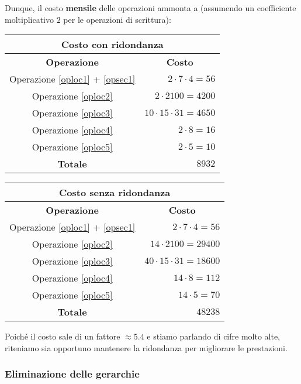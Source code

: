 \documentclass[a4paper,11pt]{article}
\begin{document}
\newline
Dunque, il costo \textbf{mensile} delle operazioni ammonta a (assumendo un
coefficiente moltiplicativo $2$ per le operazioni di scrittura):
\begin{center}
\begin{tabular}{ |c | r| }
  \hline
  \multicolumn{2}{|c|}{\textbf{Costo con ridondanza}} \\
  \hline
  \textbf{Operazione} & \multicolumn{1}{c|}{\textbf{Costo}} \\
  \hline
  Operazione \ref{oploc1} + \ref{opsec1} & $2 \cdot 7 \cdot 4 = 56$ \\
  \hline
  Operazione \ref{oploc2} & $2 \cdot 2100 = 4200$ \\
  \hline
  Operazione \ref{oploc3} & $10 \cdot 15 \cdot 31 = 4650$ \\
  \hline
  Operazione \ref{oploc4} & $2 \cdot 8 = 16$ \\
  \hline
  Operazione \ref{oploc5} & $2 \cdot 5 = 10$ \\
  \hline
  \textbf{Totale} & $8932$ \\
  \hline
\end{tabular}
\end{center}
\begin{center}
\begin{tabular}{ |c | r| }
  \hline
  \multicolumn{2}{|c|}{\textbf{Costo senza ridondanza}} \\
  \hline
  \textbf{Operazione} & \multicolumn{1}{c|}{\textbf{Costo}} \\
  \hline
  Operazione \ref{oploc1} + \ref{opsec1} & $2 \cdot 7 \cdot 4 = 56$ \\
  \hline
  Operazione \ref{oploc2} & $14 \cdot 2100 = 29400$ \\
  \hline
  Operazione \ref{oploc3} & $40 \cdot 15 \cdot 31 = 18600$ \\
  \hline
  Operazione \ref{oploc4} & $14 \cdot 8 = 112$ \\
  \hline
  Operazione \ref{oploc5} & $14 \cdot 5 = 70$ \\
  \hline
  \textbf{Totale} & $48238$ \\
  \hline
\end{tabular}
\end{center}

Poiché il costo sale di un fattore $\approx5.4$ e stiamo parlando di cifre molto alte, riteniamo sia opportuno mantenere la ridondanza per migliorare le prestazioni.

\subsubsection*{Eliminazione delle gerarchie}
\end{document}
